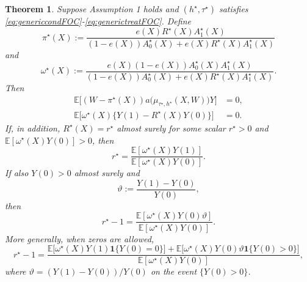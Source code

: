 \documentclass[11pt]{article}
\newtheorem{theorem}{Theorem}
\newcommand{\E}{\mathbb{E}}
\newcommand{\1}{\mathbf{1}}
\begin{document}
\begin{theorem}
\label{thm:genericclass}
Suppose Assumption 1 holds and $(h^\star,\tau^\star)$ satisfies \eqref{eq:genericcondFOC}-\eqref{eq:generictreatFOC}. Define
\begin{equation}
\pi^\star(X):=
\frac{e(X)R^\star(X)A_1^\star(X)}{(1-e(X))A_0^\star(X)+e(X)R^\star(X)A_1^\star(X)}
\label{eq:genericpi}
\end{equation}
and
\begin{equation}
\omega^\star(X):=
\frac{e(X)(1-e(X))A_0^\star(X)A_1^\star(X)}{(1-e(X))A_0^\star(X)+e(X)R^\star(X)A_1^\star(X)}.
\label{eq:genericomega}
\end{equation}
Then
\begin{align}
\E\Big[(W-\pi^\star(X))a\big(\mu_{\tau^\star,h^\star}(X,W)\big)Y\Big] &= 0,
\label{eq:genericresidmoment}
\\
\E\Big[\omega^\star(X)\{Y(1)-R^\star(X)Y(0)\}\Big] &= 0.
\label{eq:genericcausalmoment}
\end{align}
If, in addition, $R^\star(X)=r^\star$ almost surely for some scalar $r^\star>0$ and $\E[\omega^\star(X)Y(0)]>0$, then
\begin{equation}
r^\star
=
\frac{\E[\omega^\star(X)Y(1)]}{\E[\omega^\star(X)Y(0)]}.
\label{eq:genericratio}
\end{equation}
If also $Y(0)>0$ almost surely and
\[
\vartheta:=\frac{Y(1)-Y(0)}{Y(0)},
\]
then
\begin{equation}
r^\star-1
=
\frac{\E[\omega^\star(X)Y(0)\vartheta]}{\E[\omega^\star(X)Y(0)]}.
\label{eq:genericintensive}
\end{equation}
More generally, when zeros are allowed,
\begin{equation}
r^\star-1
=
\frac{
\E\big[\omega^\star(X)Y(1)\1\{Y(0)=0\}\big]
+
\E\big[\omega^\star(X)Y(0)\vartheta\1\{Y(0)>0\}\big]
}{\E[\omega^\star(X)Y(0)]},
\label{eq:genericextensiveintensive}
\end{equation}
where $\vartheta=(Y(1)-Y(0))/Y(0)$ on the event $\{Y(0)>0\}$.
\end{theorem}
\end{document}
